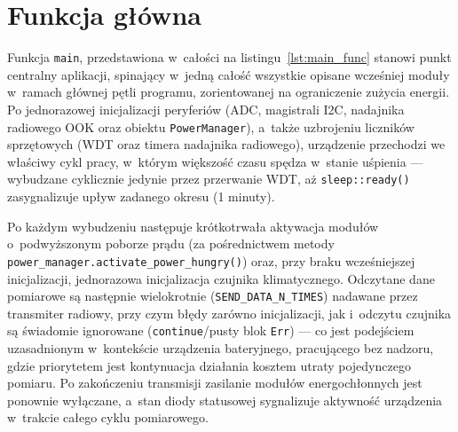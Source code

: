 \section{Funkcja główna}
Funkcja \texttt{main}, przedstawiona w~całości na 
listingu~\ref{lst:main_func} stanowi punkt centralny aplikacji, 
spinający w~jedną całość wszystkie opisane wcześniej moduły w~ramach 
głównej pętli programu, zorientowanej na ograniczenie 
zużycia energii. Po jednorazowej inicjalizacji peryferiów 
(ADC, magistrali I2C, nadajnika radiowego OOK oraz obiektu 
\texttt{PowerManager}), a~także uzbrojeniu liczników 
sprzętowych (WDT oraz timera nadajnika radiowego), urządzenie 
przechodzi we właściwy cykl pracy, w~którym większość czasu 
spędza w~stanie uśpienia — wybudzane cyklicznie jedynie przez 
przerwanie WDT, aż \texttt{sleep::ready()} zasygnalizuje upływ 
zadanego okresu (1 minuty).

Po każdym wybudzeniu następuje krótkotrwała aktywacja modułów 
o~podwyższonym poborze prądu (za pośrednictwem metody 
\texttt{power\_manager.activate\_power\_hungry()}) oraz, przy
braku wcześniejszej inicjalizacji, jednorazowa inicjalizacja 
czujnika klimatycznego. Odczytane dane pomiarowe są następnie 
wielokrotnie (\texttt{SEND\_DATA\_N\_TIMES}) nadawane przez transmiter radiowy, 
przy czym błędy zarówno inicjalizacji, jak i~odczytu czujnika są 
świadomie ignorowane (\texttt{continue}/pusty blok \texttt{Err}) — co jest podejściem 
uzasadnionym w~kontekście urządzenia bateryjnego, pracującego bez 
nadzoru, gdzie priorytetem jest kontynuacja działania kosztem 
utraty pojedynczego pomiaru. Po zakończeniu transmisji zasilanie 
modułów energochłonnych jest ponownie wyłączane, a~stan diody 
statusowej sygnalizuje aktywność urządzenia w~trakcie całego 
cyklu pomiarowego.

